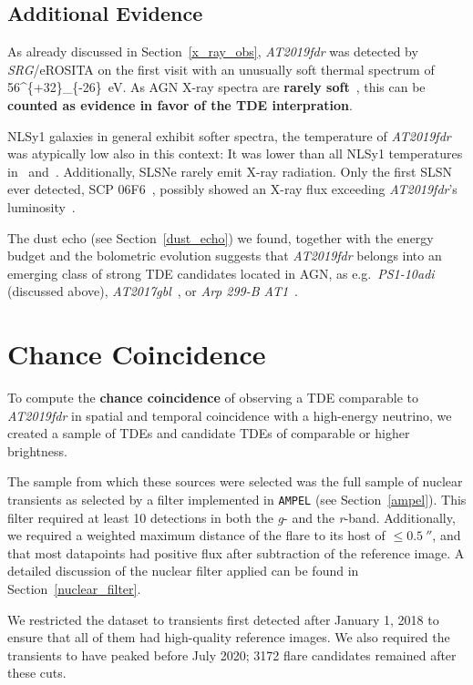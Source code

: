 \subsection{Additional Evidence}
As already discussed in Section~\ref{x_ray_obs}, \emph{AT2019fdr} was detected by \textit{SRG}/eROSITA on the first visit with an unusually soft thermal spectrum of \SI[parse-numbers = false]{56^{+32}_{-26}}{\eV}. As AGN X-ray spectra are \textbf{rarely soft}~, this can be \textbf{counted as evidence in favor of the TDE interpration}.

NLSy1 galaxies in general exhibit softer spectra, the temperature of \emph{AT2019fdr} was atypically low also in this context: It was lower than all NLSy1 temperatures in~ and~. Additionally, SLSNe rarely emit X-ray radiation. Only the first SLSN ever detected, SCP 06F6~, possibly showed an X-ray flux exceeding \emph{AT2019fdr}'s luminosity~.

The dust echo (see Section~\ref{dust_echo}) we found, together with the energy budget and the bolometric evolution suggests that \emph{AT2019fdr} belongs into an emerging class of strong TDE candidates located in AGN, as e.g.\ \emph{PS1-10adi} (discussed above), \emph{AT2017gbl}~, or \emph{Arp 299-B AT1}~.

\section{Chance Coincidence}
To compute the \textbf{chance coincidence} of observing a TDE comparable to \emph{AT2019fdr} in spatial and temporal coincidence with a high-energy neutrino, we created a sample of TDEs and candidate TDEs of comparable or higher brightness.

The sample from which these sources were selected was the full sample of nuclear transients as selected by a filter implemented in \texttt{AMPEL} (see Section~\ref{ampel}). This filter required at least 10 detections in both the \textit{g}- and the \textit{r}-band. Additionally, we required a weighted maximum distance of the flare to its host of $\leq \SI{0.5}{\arcsecond}$, and that most datapoints had positive flux after subtraction of the reference image. A detailed discussion of the nuclear filter applied can be found in Section~\ref{nuclear_filter}.

We restricted the dataset to transients first detected after January 1, 2018 to ensure that all of them had high-quality reference images. We also required the transients to have peaked before July 2020; 3172 flare candidates remained after these cuts.

